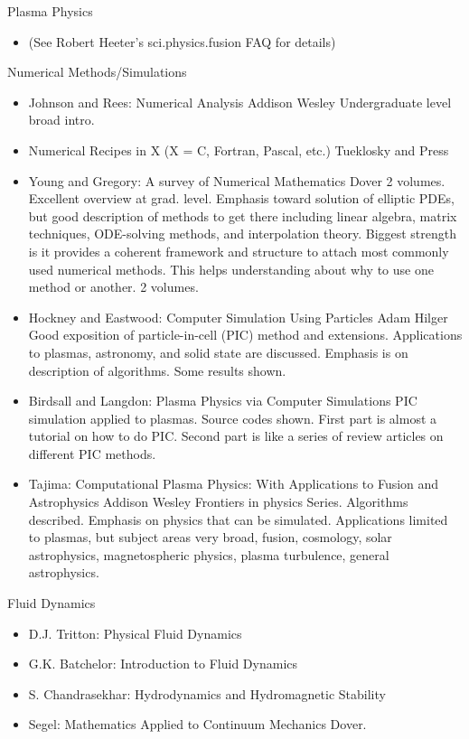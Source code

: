 \documentclass[10pt,a4paper]{book}
\theoremstyle{definition}
\begin{document}
Plasma Physics
\begin{itemize}
\item (See Robert Heeter's sci.physics.fusion FAQ for details)
\end{itemize}



Numerical Methods/Simulations
\begin{itemize}
\item Johnson and Rees: Numerical Analysis Addison Wesley
Undergraduate level broad intro.
\item Numerical Recipes in X (X = C, Fortran, Pascal, etc.) Tueklosky and Press
\item Young and Gregory: A survey of Numerical Mathematics Dover 2 volumes.
Excellent overview at grad. level.  Emphasis toward solution of elliptic PDEs, but good description of methods to get there including linear algebra, matrix techniques, ODE-solving methods, and interpolation theory.  Biggest strength is it provides a coherent framework and structure to attach most commonly used numerical methods.  This helps understanding about why to use one method or another.  2 volumes.
\item Hockney and Eastwood: Computer Simulation Using Particles Adam Hilger
Good exposition of particle-in-cell (PIC) method and extensions.  Applications to plasmas, astronomy, and solid state are discussed.  Emphasis is on description of algorithms.  Some results shown.
\item Birdsall and Langdon: Plasma Physics via Computer Simulations
PIC simulation applied to plasmas.  Source codes shown.  First part is almost a tutorial on how to do PIC.  Second part is like a series of review articles on different PIC methods.
\item Tajima: Computational Plasma Physics: With Applications to Fusion and Astrophysics Addison Wesley Frontiers in physics Series.
Algorithms described.  Emphasis on physics that can be simulated.  Applications limited to plasmas, but subject areas very broad, fusion, cosmology, solar astrophysics, magnetospheric physics, plasma turbulence, general astrophysics.
\end{itemize}


Fluid Dynamics
\begin{itemize}
\item D.J. Tritton: Physical Fluid Dynamics
\item G.K. Batchelor: Introduction to Fluid Dynamics
\item S. Chandrasekhar: Hydrodynamics and Hydromagnetic Stability
\item Segel: Mathematics Applied to Continuum Mechanics Dover.
\end{itemize}
\end{document}
